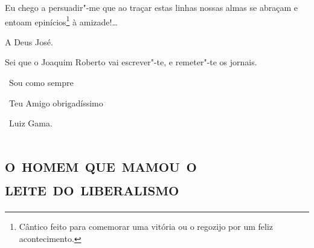 Eu chego a persuadir"-me que ao traçar estas linhas nossas almas se
abraçam e entoam epinícios\footnote{Cântico feito para comemorar uma
  vitória ou o regozijo por um feliz acontecimento.}
à amizade!\ldots{}

A Deus José.

Sei que o Joaquim Roberto vai escrever"-te, e remeter"-te os jornais.

\bigskip

\hfill\ Sou como sempre

\hfill\ Teu Amigo obrigadíssimo

\hfill\ Luiz Gama.

\pagebreak
\thispagestyle{empty}
\movetooddpage
\thispagestyle{empty}
\begingroup\makeatletter\@openrightfalse
\part[O homem que mamou o leite do liberalismo]{\textsc{o homem que mamou o\\ leite do liberalismo}}

\mbox{}\vfill
\thispagestyle{empty}

